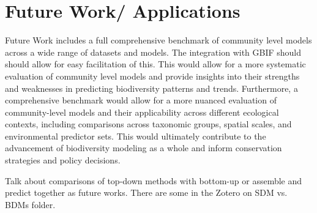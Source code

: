 \section{Future Work/ Applications}\label{sec:future_work}
Future Work includes a full comprehensive benchmark of community level models across a wide range of datasets and models. The integration with GBIF should should allow for easy facilitation of this. This would allow for a more systematic evaluation of community level models and provide insights into their strengths and weaknesses in predicting biodiversity patterns and trends. Furthermore, a comprehensive benchmark would allow for a more nuanced evaluation of community-level models and their applicability across different ecological contexts, including comparisons across taxonomic groups, spatial scales, and environmental predictor sets. This would ultimately contribute to the advancement of biodiversity modeling as a whole and inform conservation strategies and policy decisions.




Talk about comparisons of top-down methods with bottom-up or assemble and predict together as future works. There are some in the Zotero on SDM vs. BDMs folder.
